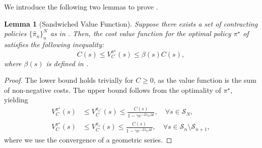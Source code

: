 \documentclass[lettersize,journal]{IEEEtran}
\newcommand{\mc}{\mathcal}
\newtheorem{lemma}{Lemma}
\begin{document}
We introduce the following two lemmas to prove .
\begin{lemma}[Sandwiched Value Function]\label{lemma:value_sandwich}
    Suppose there exists a set of contracting policies $\{ \hat \pi_n\}_{n}^N$ as in .
    Then, the cost value function for the optimal policy $\pi^\star$ of  satisfies the following inequality:
    \begin{equation}
        C(s) \leq V^{\pi^\star}_{C}(s) \leq \beta(s) C(s), 
    \end{equation}
    where $\beta(s)$ is defined in .
\end{lemma}
\begin{proof}
    The lower bound holds trivially for $C \ge 0$, as the value function is the sum of non-negative costs.
    The upper bound follows from the optimality of $\pi^\star$, yielding
    \begin{align}
        V^{\pi^\star}_C(s) & \leq V^{\pi_{c^*}}_C(s) \leq \frac{C(s)}{1 - \gamma e^{-2 \lambda_N \Delta t}}, \quad \forall s \in \mc{S}_N, \\ 
        V^{\pi^\star}_C(s) & \leq V^{\pi_c}_C(s) \leq \frac{C(s)}{1 - \gamma e^{-2 \lambda_n \Delta t}}, \quad \forall s \in \mc{S}_n \setminus \mc{S}_{n+1},
    \end{align}
    where we use the convergence of a geometric series.
\end{proof}
\end{document}
